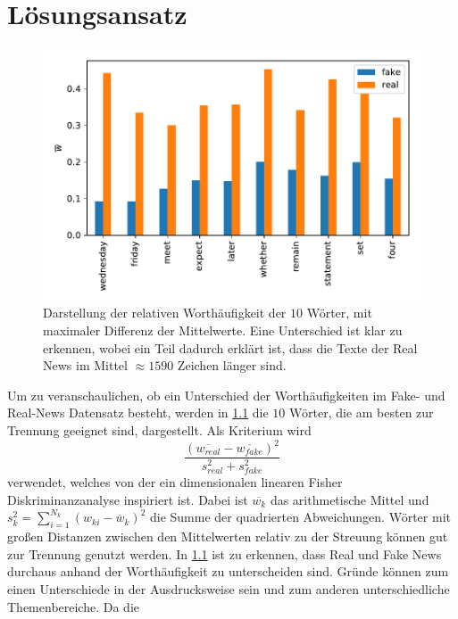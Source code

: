 \chapter{Lösungsansatz}

\begin{figure}
    \centering
    \includegraphics[]{pictures/data_visualisation.pdf}
    \caption{Darstellung der relativen Worthäufigkeit der $10$ Wörter, mit maximaler Differenz der Mittelwerte.
            Eine Unterschied ist klar zu erkennen, wobei ein Teil dadurch erklärt ist, dass die Texte der Real 
            News im Mittel $\approx 1590$ Zeichen länger sind.}
    \label{fig:word_plot}
\end{figure}
Um zu veranschaulichen, ob ein Unterschied der Worthäufigkeiten im Fake- und Real-News Datensatz besteht, werden in \ref{fig:word_plot}
die $10$ Wörter, die am besten zur Trennung geeignet sind, dargestellt. 
Als Kriterium wird 
\begin{equation}
    \frac{(\overline{w_{real}}-\overline{w_{fake}})^2}{s_{real}^2+s_{fake}^2}
\end{equation}
verwendet, welches von der ein dimensionalen linearen Fisher Diskriminanzanalyse inspiriert ist. 
Dabei ist $\overline{w_k}$ das arithmetische Mittel und $s_{k}^{2}=\sum_{i=1}^{N_{k}}\left(w_{k i}-\overline{w}_{k}\right)^{2}$ 
die Summe der quadrierten Abweichungen.
Wörter mit großen Distanzen zwischen den Mittelwerten relativ zu der Streuung können gut zur Trennung genutzt werden.
In \ref{fig:word_plot} ist zu erkennen, dass Real und Fake News durchaus anhand der Worthäufigkeit zu unterscheiden sind. 
Gründe können zum einen Unterschiede in der Ausdrucksweise sein und zum anderen unterschiedliche Themenbereiche. Da die 
